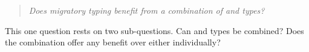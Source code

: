 
\begin{quote}
  \emph{Does migratory typing benefit from a combination of \tdeep{} and \tshallow{} types?}
\end{quote}

This one question rests on two sub-questions.
Can \tdeep{} and \tshallow{} types be combined?
Does the combination offer any benefit over either individually?

